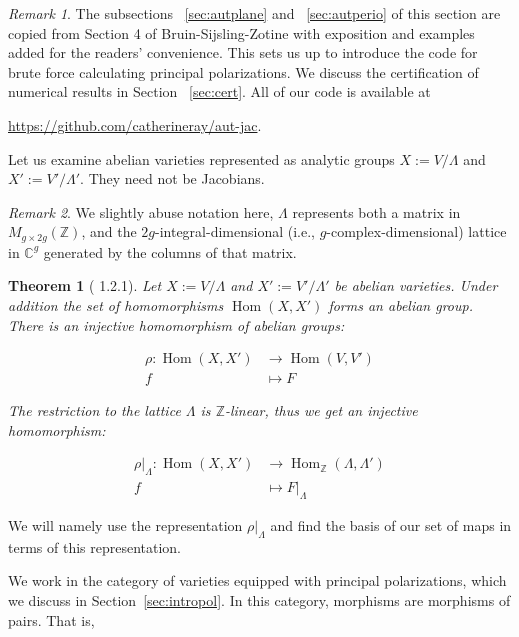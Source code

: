 \documentclass[12pt,reqno]{amsart}
\DeclareMathOperator{\Hom}{Hom}
\newcommand{\C}{\mathbb{C}}
\newcommand{\Z}{\mathbb{Z}}
\newtheorem*{thm*}{Theorem}
\theoremstyle{definition}
\theoremstyle{remark}
\newtheorem*{remark}{Remark}
\begin{document}
\label{sec:computing}

\begin{remark} The subsections ~\ref{sec:autplane} and ~\ref{sec:autperio} of this section are copied from Section 4 of Bruin-Sijsling-Zotine \cite{numerical} with exposition and examples added for the readers' convenience. This sets us up to introduce the code for brute force calculating principal polarizations. We discuss the certification of numerical results in Section ~\ref{sec:cert}. All of our code is available at \begin{center}\url{https://github.com/catherineray/aut-jac}.\end{center}  \end{remark} 

Let us examine abelian varieties represented as analytic groups $X := V/\Lambda$ and $X' := V'/\Lambda'$. They need not be Jacobians.

\begin{remark} We slightly abuse notation here, $\Lambda$ represents both a matrix in $M_{g \times 2g}(\Z)$, and the $2g$-integral-dimensional (i.e., $g$-complex-dimensional) lattice in $\C^g$ generated by the columns of that matrix.\end{remark}
 

\begin{thm*}[\cite{bl} 1.2.1] Let $X:= V/\Lambda$ and $X':= V'/\Lambda'$ be abelian varieties. Under addition the set of homomorphisms $\Hom(X, X')$ forms an abelian group. There is an injective homomorphism of abelian groups: 


\begin{align*} 
\rho: \Hom(X, X') &\to \Hom(V, V') \\
f &\mapsto F
\end{align*} 

The restriction to the lattice $\Lambda$ is $\Z$-linear, thus we get an injective homomorphism: 


\begin{align*} 
\rho|_{\Lambda}: \Hom(X, X') &\to \Hom_{\Z}(\Lambda, \Lambda') \\
f &\mapsto F|_{\Lambda}
\end{align*} 


\end{thm*}


We will namely use the representation $\rho|_{\Lambda}$ and find the basis of our set of maps in terms of this representation. 

We work in the category of varieties equipped with principal polarizations, which we discuss in Section~\ref{sec:intropol}. In this category, morphisms are morphisms of pairs. That is,
\end{document}
